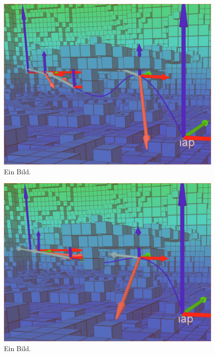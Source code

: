 \begin{figure}[h]
   \centering
   \includegraphics[width=1\textwidth]{pics/section.png}
   \caption{Ein Bild.}
\end{figure}





\begin{figure}[h]
   \centering
   \includegraphics[width=1\textwidth]{pics/Nlopt_after_sectionAndTime.png}
   \caption{Ein Bild.}
\end{figure}
